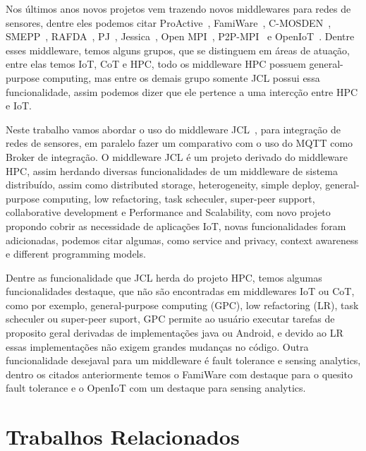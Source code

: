\documentclass[12pt]{article}
\begin{document}
Nos últimos anos novos projetos vem trazendo novos middlewares para redes de sensores, dentre eles podemos citar ProActive~\cite{ProActive}, FamiWare~\cite{FamiWare}, C-MOSDEN~\cite{c-mosden}, SMEPP~\cite{SMEPP}, RAFDA~\cite{rafda}, PJ~\cite{PJ}, Jessica~\cite{jessica}, Open MPI~\cite{open-mpi}, P2P-MPI~\cite{p2p-mpi} e OpenIoT~\cite{openiot}. Dentre esses middleware, temos alguns grupos, que se distinguem em áreas de atuação, entre elas temos IoT, CoT e HPC, todo os middleware HPC possuem general-purpose computing, mas entre os demais grupo somente JCL possui essa funcionalidade, assim podemos dizer que ele pertence a uma intercção entre HPC e IoT.

Neste trabalho vamos abordar o uso do middleware JCL~\cite{Cimino2018}, para integração de redes de sensores, em paralelo fazer um comparativo com o uso do MQTT como Broker de integração. O middleware JCL é um projeto derivado do middleware HPC, assim herdando diversas funcionalidades de um middleware de sistema distribuído, assim como distributed storage, heterogeneity, simple deploy, general-purpose computing, low refactoring, task scheculer,  super-peer support, collaborative development e Performance and Scalability, com novo projeto propondo cobrir as necessidade  de aplicações IoT, novas funcionalidades foram adicionadas, podemos citar algumas, como service and privacy, context awareness e different programming models.

Dentre as funcionalidade que JCL herda do projeto HPC, temos algumas funcionalidades destaque, que não são encontradas em middlewares IoT ou CoT, como por exemplo, general-purpose computing (GPC), low refactoring (LR), task scheculer ou super-peer suport, GPC permite ao usuário executar tarefas de proposito geral derivadas de implementações java ou Android, e devido ao LR essas implementações não exigem grandes mudanças no código. Outra funcionalidade desejaval para um middleware é fault tolerance e sensing analytics, dentro os citados anteriormente temos o FamiWare com destaque para o quesito fault tolerance e o OpenIoT com um destaque para sensing analytics.

\section{Trabalhos Relacionados} \label{sec:firstpage}
\end{document}
